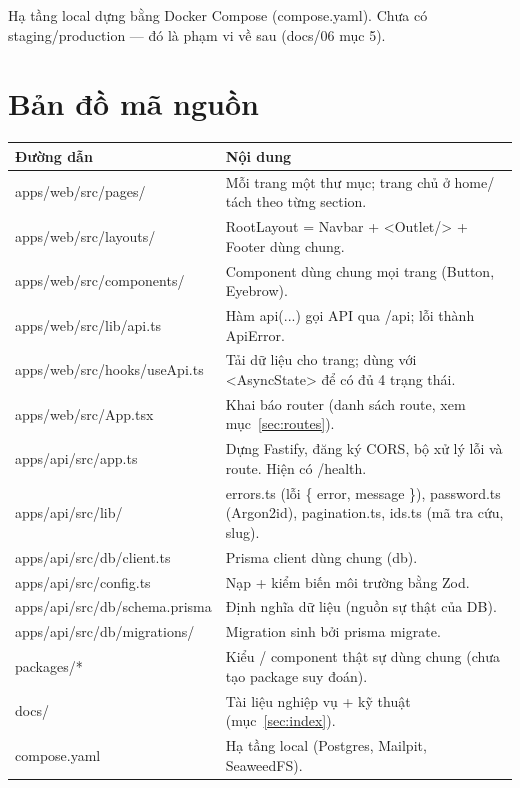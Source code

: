 \documentclass[11pt]{article}
\newcommand{\code}[1]{{\ttfamily #1}}
\begin{document}
\medskip
\noindent Hạ tầng local dựng bằng Docker Compose (\code{compose.yaml}). Chưa có staging/production —
đó là phạm vi về sau (\code{docs/06} mục 5).

\section{Bản đồ mã nguồn}\label{sec:code}
\noindent\begin{tabularx}{\textwidth}{@{}l>{\raggedright\arraybackslash}X@{}}
\toprule
\textbf{Đường dẫn} & \textbf{Nội dung} \\ \midrule
\code{apps/web/src/pages/} & Mỗi trang một thư mục; trang chủ ở \code{home/} tách theo từng section. \\
\code{apps/web/src/layouts/} & \code{RootLayout} = Navbar + \code{<Outlet/>} + Footer dùng chung. \\
\code{apps/web/src/components/} & Component dùng chung mọi trang (\code{Button}, \code{Eyebrow}). \\
\code{apps/web/src/lib/api.ts} & Hàm \code{api(...)} gọi API qua \code{/api}; lỗi thành \code{ApiError}. \\
\code{apps/web/src/hooks/useApi.ts} & Tải dữ liệu cho trang; dùng với \code{<AsyncState>} để có đủ 4 trạng thái. \\
\code{apps/web/src/App.tsx} & Khai báo router (danh sách route, xem mục~\ref{sec:routes}). \\
\code{apps/api/src/app.ts} & Dựng Fastify, đăng ký CORS, bộ xử lý lỗi và route. Hiện có \code{/health}. \\
\code{apps/api/src/lib/} & \code{errors.ts} (lỗi \code{\{ error, message \}}), \code{password.ts} (Argon2id), \code{pagination.ts}, \code{ids.ts} (mã tra cứu, slug). \\
\code{apps/api/src/db/client.ts} & Prisma client dùng chung (\code{db}). \\
\code{apps/api/src/config.ts} & Nạp + kiểm biến môi trường bằng Zod. \\
\code{apps/api/src/db/schema.prisma} & Định nghĩa dữ liệu (nguồn sự thật của DB). \\
\code{apps/api/src/db/migrations/} & Migration sinh bởi \code{prisma migrate}. \\
\code{packages/*} & Kiểu / component thật sự dùng chung (chưa tạo package suy đoán). \\
\code{docs/} & Tài liệu nghiệp vụ + kỹ thuật (mục~\ref{sec:index}). \\
\code{compose.yaml} & Hạ tầng local (Postgres, Mailpit, SeaweedFS). \\ \bottomrule
\end{tabularx}
\end{document}
